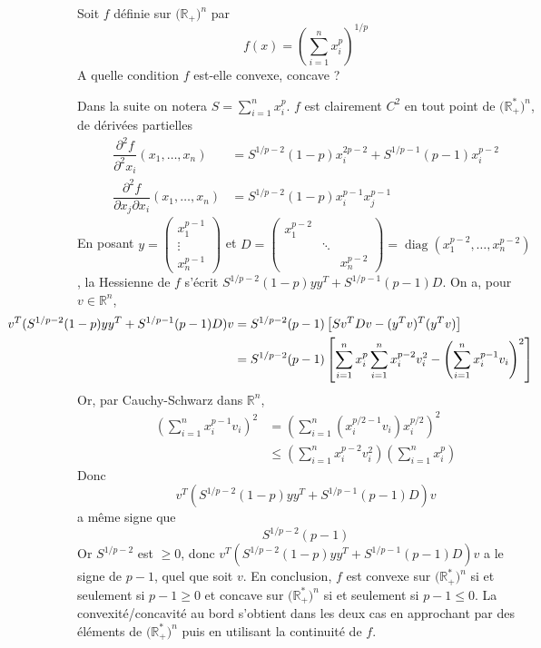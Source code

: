 \documentclass{fancybook}
\DeclareMathOperator{\diag}{diag}
\begin{document}
\begin{exercice}
Soit $f$ définie sur $\mathbb (\mathbb R_+)^n$ par $$f(x)=\left(\sum_{i=1}^n x_i^p\right)^{1/p}$$
A quelle condition $f$ est-elle convexe, concave ?
\end{exercice}
Dans la suite on notera $S=\sum_{i=1}^n x_i^p$.\newline
$f$ est clairement $C^2$ en tout point de $\mathbb (\mathbb R_+^*)^n$, de dérivées partielles 
$$\begin{aligned}
\dfrac{\partial^2 f}{\partial^2x_i}(x_1,\ldots,x_n) &= S^{1/p-2}(1-p)x_i^{2p-2} +S^{1/p-1}(p-1)x_i^{p-2} \\
\dfrac{\partial^2 f}{\partial x_j \partial x_i}(x_1,\ldots,x_n) &= S^{1/p-2}(1-p)x_i^{p-1} x_j^{p-1}
\end{aligned}$$
En posant $y=\begin{pmatrix}
x_1^{p-1} \\
\vdots \\
x_n^{p-1} 
\end{pmatrix}$ et $D=\begin{pmatrix}
x_1^{p-2}  \\
& \ddots \\
&& x_n^{p-2} 
\end{pmatrix}=\diag(x_1^{p-2},\ldots,x_n^{p-2})$,\newline
\newline
la Hessienne de $f$ s'écrit $S^{1/p-2}(1-p)yy^T +S^{1/p-1}(p-1)D$. On a, pour $v\in \mathbb R^n$,
$$\begin{aligned}
\hspace{-2cm}
v^T(S^{1/p-2}(1-p)yy^T +S^{1/p-1}(p-1)D)v &= S^{1/p-2}(p-1) \left[ S v^TDv - (y^Tv)^T(y^Tv)\right] \\
&= S^{1/p-2}(p-1) \left[ \sum_{i=1}^n x_i^p \sum_{i=1}^n x_i^{p-2}v_i^2 - \left(\sum_{i=1}^n x_i^{p-1}v_i\right)^2 \right]
\end{aligned}$$
Or, par Cauchy-Schwarz dans $\mathbb R^n$, $$\begin{aligned}\left(\sum_{i=1}^n x_i^{p-1}v_i\right)^2 &= \left(\sum_{i=1}^n (x_i^{p/2-1}v_i)x_i^{p/2}\right)^2 \\
&\leq \left(\sum_{i=1}^n x_i^{p-2}v_i^2\right) \left( \sum_{i=1}^n x_i^p\right)
 \end{aligned}$$
 Donc $$v^T(S^{1/p-2}(1-p)yy^T +S^{1/p-1}(p-1)D)v$$ a même signe que $$S^{1/p-2}(p-1)$$
 Or $S^{1/p-2}$ est $\geq 0$, donc $v^T(S^{1/p-2}(1-p)yy^T +S^{1/p-1}(p-1)D)v$ a le signe de $p-1$, quel que soit $v$.
\newline
\newline
En conclusion, $f$ est convexe sur $\mathbb (\mathbb R_+^*)^n$ si et seulement si $p-1\geq 0$ et concave sur $\mathbb (\mathbb R_+^*)^n$ si et seulement si $p-1\leq 0$.\newline
La convexité/concavité au bord s'obtient dans les deux cas en approchant par des éléments de $\mathbb (\mathbb R_+^*)^n$ puis en utilisant la continuité de $f$.
\end{document}
